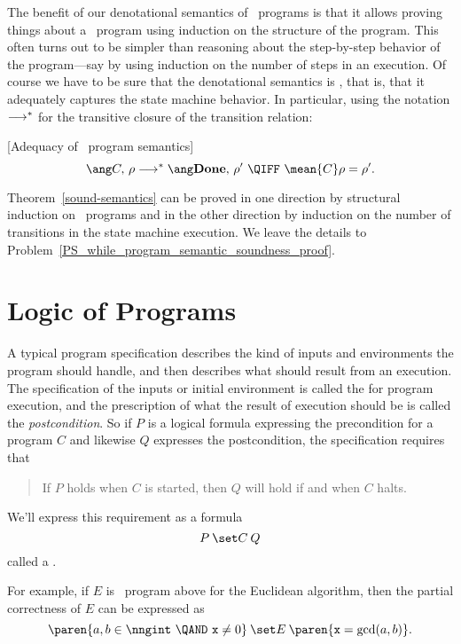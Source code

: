 The benefit of our denotational semantics of \while\ programs is that it allows
proving things about a \while\ program using induction on the structure of the
program.  This often turns out to be simpler than reasoning about the
step-by-step behavior of the program---say by using induction on the number of
steps in an execution.  Of course we have to be sure that the denotational
semantics is , that is, that it adequately captures the state
machine behavior.  In particular, using the notation $\mathrel{\longrightarrow}^*$ for the
transitive closure of the transition relation:

\begin{theorem}\label{sound-semantics}[Adequacy of \while\ program semantics]
\[
\haltswith{C}{\rho}{\rho'}\ \QIFF\ \mean{C}\rho = \rho'.
\]
\end{theorem}
Theorem~\ref{sound-semantics} can be proved in one direction by structural
induction on \while\ programs and in the other direction by induction on the
number of transitions in the state machine execution.  We leave the details to
Problem~\ref{PS_while_program_semantic_soundness_proof}.

\begin{problems}
\homeworkproblems
{}
\end{problems}

\section{Logic of Programs}

A typical program specification describes the kind of inputs and
environments the program should handle, and then describes what should
result from an execution.  The specification of the inputs or initial
environment is called the  for program execution, and
the prescription of what the result of execution should be is called the
\emph{postcondition}.  So if $P$ is a logical formula expressing the precondition
for a program $C$ and likewise $Q$ expresses the postcondition, the
specification requires that
\begin{quote}
If $P$ holds when $C$ is started, then $Q$ will hold if and when $C$ halts.
\end{quote}
We'll express this requirement as a formula
\[
\after{P}{C}{Q}
\]
called a .

For example, if $E$ is \while\ program above for the Euclidean
algorithm, then the partial correctness of $E$ can be expressed as
\begin{equation}\label{eucpc}
\after{\paren{a, b \in \nngint\ \QAND\  \mathtt{x} \neq 0}}{E}
                   {\paren{\mathtt{x} = \gcd(a,b)}}.
\end{equation}

